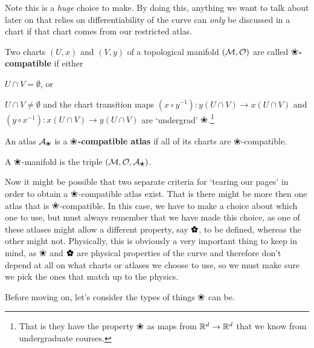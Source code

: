 Note this is a \textit{huge} choice to make. By doing this, anything we want to talk about later on that relies on differentiability of the curve can \textit{only} be discussed in a chart if that chart comes from our restricted atlas. 

    Two charts $(U,x)$ and $(V,y)$ of a topological manifold $(\mathcal{M},\mathcal{O})$ are called \textbf{$\flower$-compatible} if either
    \ben[label=(\alph*)] 
        \item $U\cap V =\emptyset$, or 
        \item $U\cap V \neq \emptyset$ and the chart transition maps $(x\circ y^{-1}):y(U\cap V) \to x(U\cap V)$ and $(y\circ x^{-1}):x(U\cap V) \to y(U\cap V)$ are `undergrad' $\flower$.\footnote{That is they have the property $\flower$ as maps from $\mathbb{R}^d\to \mathbb{R}^d$ that we know from undergraduate courses.}
    \een 
\ed 

    An atlas $\cA_{\flower}$ is a \textbf{$\flower$-compatible atlas} if all of its charts are $\flower$-compatible.
\ed 

\bd[]
    A $\flower$-manifold is the triple $(\cM,\cO,\cA_{\flower})$.
\ed 

Now it might be possible that two separate criteria for `tearing our pages' in order to obtain a $\flower$-compatible atlas exist. That is there might be more then one atlas that is $\flower$-compatible. In this case, we have to make a choice about which one to use, but must always remember that we have made this choice, as one of these atlases might allow a different property, say $\flowerf$, to be defined, whereas the other might not. Physically, this is obviously a very important thing to keep in mind, as $\flower$ and $\flowerf$ are physical properties of the curve and therefore don't depend at all on what charts or atlases we choose to use, so we must make sure we pick the ones that match up to the physics.

Before moving on, let's consider the types of things $\flower$ can be. 

